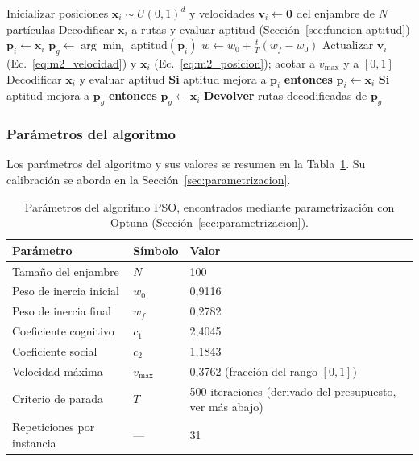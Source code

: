 \begin{algorithm}[H]
\caption{PSO para el CVRP (representación SR-1)}
\label{alg:pso_cvrp}
\begin{algorithmic}[1]
    \State Inicializar posiciones $\mathbf{x}_i \sim U(0,1)^d$ y velocidades $\mathbf{v}_i \gets \mathbf{0}$ del enjambre de $N$ partículas
        \State Decodificar $\mathbf{x}_i$ a rutas y evaluar aptitud (Sección~\ref{sec:funcion-aptitud})
        \State $\mathbf{p}_i \gets \mathbf{x}_i$
    \EndFor
    \State $\mathbf{p}_g \gets \arg\min_i \; \text{aptitud}(\mathbf{p}_i)$
        \State $w \gets w_0 + \frac{t}{T}(w_f - w_0)$
            \State Actualizar $\mathbf{v}_i$ (Ec.~\ref{eq:m2_velocidad}) y $\mathbf{x}_i$ (Ec.~\ref{eq:m2_posicion}); acotar a $v_{\max}$ y a $[0,1]$
            \State Decodificar $\mathbf{x}_i$ y evaluar aptitud
            \State \textbf{Si} aptitud mejora a $\mathbf{p}_i$ \textbf{entonces} $\mathbf{p}_i \gets \mathbf{x}_i$
            \State \textbf{Si} aptitud mejora a $\mathbf{p}_g$ \textbf{entonces} $\mathbf{p}_g \gets \mathbf{x}_i$
        \EndFor
    \EndFor
    \State \textbf{Devolver} rutas decodificadas de $\mathbf{p}_g$
\EndProcedure
\end{algorithmic}
\end{algorithm}

\subsubsection{Parámetros del algoritmo}

Los parámetros del algoritmo y sus valores se resumen en la Tabla~\ref{tab:m2_parametros}.
Su calibración se aborda en la Sección~\ref{sec:parametrizacion}.

\begin{table}[H]
\centering
\caption{Parámetros del algoritmo PSO, encontrados mediante parametrización con Optuna
(Sección~\ref{sec:parametrizacion}).}
\label{tab:m2_parametros}
\begin{tabular}{lll}
\hline
Parámetro & Símbolo & Valor \\
\hline
Tamaño del enjambre       & $N$        & 100 \\
Peso de inercia inicial   & $w_0$      & 0{,}9116 \\
Peso de inercia final     & $w_f$      & 0{,}2782 \\
Coeficiente cognitivo     & $c_1$      & 2{,}4045 \\
Coeficiente social        & $c_2$      & 1{,}1843 \\
Velocidad máxima          & $v_{\max}$ & 0{,}3762 (fracción del rango $[0,1]$) \\
Criterio de parada        & $T$        & 500 iteraciones (derivado del presupuesto, ver más abajo) \\
Repeticiones por instancia& ---        & 31 \\
\hline
\end{tabular}
\end{table}

